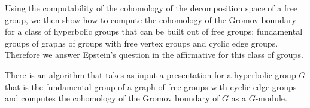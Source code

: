 Using the computability of the \vCech{} cohomology of the decomposition space of a free group, we then show how to compute the \vCech{} cohomology of the Gromov boundary for a class of hyperbolic groups that can be built out of free groups: fundamental groups of graphs of groups with free vertex groups and cyclic edge groups.
Therefore we answer Epstein's question in the affirmative for this class of groups.

\begin{theorem}\label{theorem:intro_cech_cohomology_graph_of_groups}
  There is an algorithm that takes as input a presentation for a hyperbolic group $G$ that is the fundamental group of a graph of free groups with cyclic edge groups and computes the \vCech{} cohomology of the Gromov boundary of $G$ as a $G$-module.
\end{theorem}

